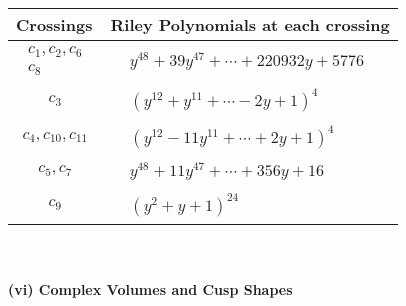 \documentclass[1p]{elsarticle_modified}
\theoremstyle{definition}
\begin{document}
\begin{tabular}{m{50pt}|m{274pt}}
Crossings & \hspace{64pt}Riley Polynomials at each crossing \\
\hline $$\begin{aligned}c_{1},c_{2},c_{6}\\c_{8}\end{aligned}$$&$\begin{aligned}
&y^{48}+39 y^{47}+\cdots+220932 y+5776
\end{aligned}$\\
\hline $$\begin{aligned}c_{3}\end{aligned}$$&$\begin{aligned}
&(y^{12}+y^{11}+\cdots-2 y+1)^{4}
\end{aligned}$\\
\hline $$\begin{aligned}c_{4},c_{10},c_{11}\end{aligned}$$&$\begin{aligned}
&(y^{12}-11 y^{11}+\cdots+2 y+1)^{4}
\end{aligned}$\\
\hline $$\begin{aligned}c_{5},c_{7}\end{aligned}$$&$\begin{aligned}
&y^{48}+11 y^{47}+\cdots+356 y+16
\end{aligned}$\\
\hline $$\begin{aligned}c_{9}\end{aligned}$$&$\begin{aligned}
&(y^2+y+1)^{24}
\end{aligned}$\\
\hline
\end{tabular}\\~\\
\newpage\flushleft \textbf{(vi) Complex Volumes and Cusp Shapes}
\end{document}
